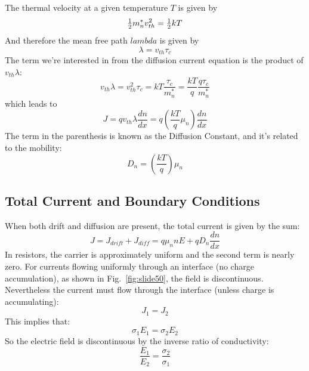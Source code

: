 The thermal velocity at a given temperature $T$ is given by
%
\begin{equation}
        {\textstyle{1 \over 2}}m_n^*v_{th}^2 = {\textstyle{1 \over 2}}kT
\end{equation}
%
And therefore the mean free path $lambda$ is given by
\begin{equation}
        \lambda  = {v_{th}}{\tau _c}
\end{equation}
The term we're interested in from the diffusion current equation is the product of $v_{th} \lambda$:
%
\begin{equation}
        {v_{th}}\lambda  = v_{th}^2{\tau _c} = kT\frac{{{\tau _c}}}{{m_n^*}} = \frac{{kT}}{q}\frac{{q{\tau _c}}}{{m_n^*}}
\end{equation}
%
which leads to
%
\begin{equation}
        J = q{v_{th}}\lambda \frac{{dn}}{{dx}} = q\left( {\frac{{kT}}{q}{\mu _n}} \right)\frac{{dn}}{{dx}}
\end{equation}
The term in the parenthesis is known as the Diffusion Constant, and it's related to the mobility: 
\begin{equation}
        {D_n} = \left( {\frac{{kT}}{q}} \right){\mu _n}
\end{equation}







\subsection{Total Current and Boundary Conditions}

When both drift and diffusion are present, the total current is given by the sum:
\begin{equation}
        J = {J_{drift}} + {J_{diff}} = q{\mu _n}nE + q{D_n}\frac{{dn}}{{dx}}
\end{equation}
In resistors, the carrier is approximately uniform and the second term is nearly zero. For currents flowing uniformly through an interface (no charge accumulation), as shown in Fig.~\ref{fig:slide50}, the field is discontinuous.  Nevertheless the current must flow through the interface (unless charge is accumulating):
%
\begin{equation} {J_1} = {J_2}\end{equation}
%
This implies that:
%
\begin{equation}{\sigma _1}{E_1} = {\sigma _2}{E_2}\end{equation}
%
So the electric field is discontinuous by the inverse ratio of conductivity:
%
\begin{equation}\frac{{{E_1}}}{{{E_2}}} = \frac{{{\sigma _2}}}{{{\sigma _1}}}\end{equation}







